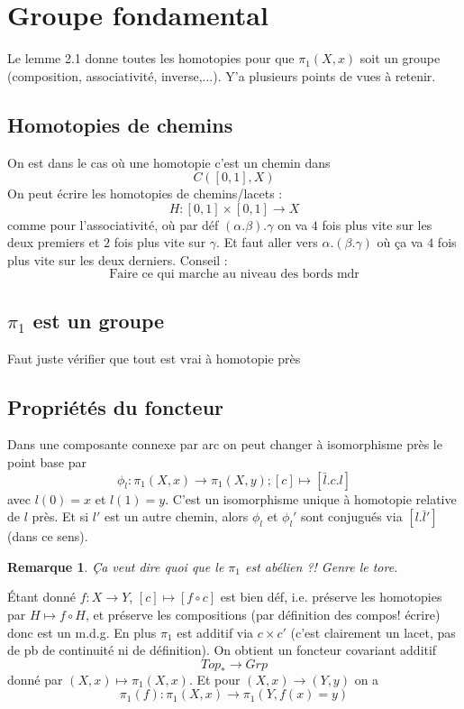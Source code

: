 \documentclass[a4paper,12pt]{book}
\theoremstyle{plain}
\newtheorem{rem}{Remarque}
\theoremstyle{definition}
\theoremstyle{remark}
\begin{document}
\section{Groupe fondamental}
Le lemme 2.1 donne toutes les homotopies pour que $\pi_1(X,x)$ 
soit un groupe (composition, associativité, inverse,...). Y'a 
plusieurs points de vues à retenir.

\subsection{Homotopies de chemins}
On est dans le cas où une homotopie c'est un chemin dans 
\[C([0,1],X)\]
On peut écrire les homotopies de chemins/lacets : 
\[H\colon [0,1]\times [0,1]\to X\]
comme pour l'associativité, où par déf $(\alpha.\beta).\gamma$
on va $4$ fois plus vite sur les deux premiers et $2$ fois
plus vite sur $\gamma$. Et faut aller vers $\alpha.(\beta.\gamma)$
où ça va $4$ fois plus vite sur les deux derniers.
Conseil :
\[\textrm{Faire ce qui marche au niveau des bords mdr}\]
\subsection{$\pi_1$ est un groupe}
Faut juste vérifier que tout est vrai à homotopie près
\subsection{Propriétés du foncteur}
Dans une composante connexe par arc on peut changer à isomorphisme
près le point base par 
\[\phi_l\colon \pi_1(X,x)\to \pi_1(X,y);[c]\mapsto [\bar l.c.l]\] avec $l(0)=x$
et $l(1)=y$. C'est un isomorphisme unique à homotopie relative de
$l$ près. Et si $l'$ est un autre chemin,
alors $\phi_l$ et $\phi_l'$ sont conjugués via $[l.\bar l']$ (dans
ce sens).
\begin{rem}
  Ça veut dire quoi que le $\pi_1$ est abélien ?! Genre le tore.
\end{rem}
Étant donné $f\colon X\to Y$, $[c]\mapsto [f\circ c]$
est bien déf, i.e. préserve les homotopies par $H\mapsto f\circ H$,
et préserve les compositions (par définition des compos! écrire)
donc est un m.d.g. En plus
$\pi_1$ est additif via $c\times c'$ (c'est clairement un lacet,
pas de pb de continuité ni de définition). On obtient
un foncteur covariant additif
\[Top_*\to Grp\]
donné par $(X,x)\mapsto \pi_1(X,x)$. Et pour $(X,x)\to (Y,y)$ on
a
\[\pi_1(f)\colon \pi_1(X,x)\to \pi_1(Y,f(x)=y)\]
\end{document}
